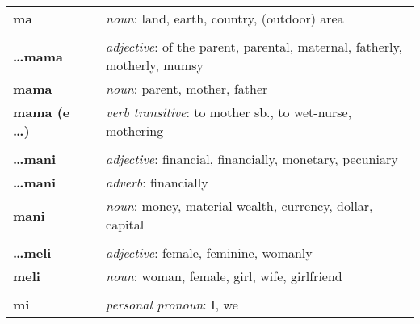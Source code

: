 \begin{supertabular}{p{2,5cm}|ll}
    \textbf{ma}                  &  & \textit{noun}: land, earth, country, (outdoor) area                                                        \\
                                 &  &                                                                                                            \\ %
    \textbf{\dots mama}          &  & \textit{adjective}: of the parent, parental, maternal, fatherly, motherly, mumsy                           \\
    \textbf{mama}                &  & \textit{noun}: parent, mother, father                                                                      \\
    \textbf{mama (e \dots)}      &  & \textit{verb transitive}: to mother sb., to wet-nurse, mothering                                           \\
                                 &  &                                                                                                            \\ %
    \textbf{\dots mani}          &  & \textit{adjective}: financial, financially, monetary, pecuniary                                            \\
    \textbf{\dots mani}          &  & \textit{adverb}: financially                                                                               \\
    \textbf{mani}                &  & \textit{noun}: money, material wealth, currency, dollar, capital                                           \\
                                 &  &                                                                                                            \\ %
    \textbf{\dots meli}          &  & \textit{adjective}: female, feminine, womanly                                                              \\
    \textbf{meli}                &  & \textit{noun}: woman, female, girl, wife, girlfriend                                                       \\
                                 &  &                                                                                                            \\ %
    \textbf{mi}                  &  & \textit{personal pronoun}: I, we                                                                           \\

\end{supertabular}
